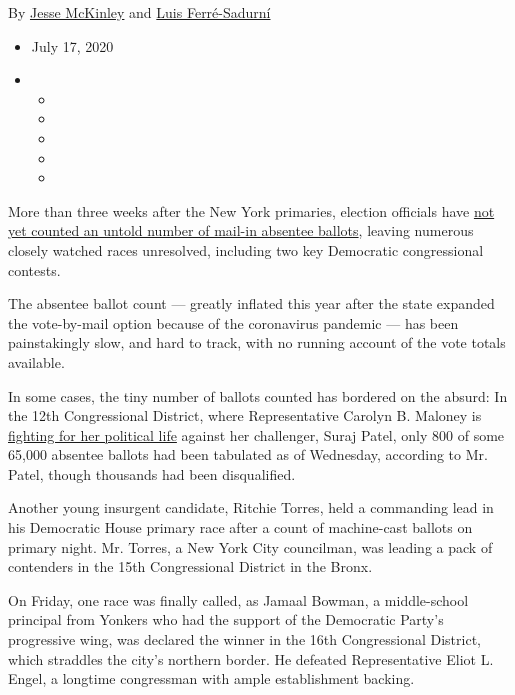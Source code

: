 By \href{https://www.nytimes.com/by/jesse-mckinley}{Jesse McKinley} and
\href{https://www.nytimes.com/by/luis-ferre-sadurni}{Luis Ferré-Sadurní}

\begin{itemize}
\item
  July 17, 2020
\item
  \begin{itemize}
  \item
  \item
  \item
  \item
  \item
  \end{itemize}
\end{itemize}

More than three weeks after the New York primaries, election officials
have
\href{https://www.nytimes.com/2020/08/03/nyregion/nyc-mail-ballots-voting.html}{not
yet counted an untold number of mail-in absentee ballots}, leaving
numerous closely watched races unresolved, including two key Democratic
congressional contests.

The absentee ballot count --- greatly inflated this year after the state
expanded the vote-by-mail option because of the coronavirus pandemic ---
has been painstakingly slow, and hard to track, with no running account
of the vote totals available.

In some cases, the tiny number of ballots counted has bordered on the
absurd: In the 12th Congressional District, where Representative Carolyn
B. Maloney is \href{https://web.enrboenyc.us/CD235630.html}{fighting for
her political life} against her challenger, Suraj Patel, only 800 of
some 65,000 absentee ballots had been tabulated as of Wednesday,
according to Mr. Patel, though thousands had been disqualified.

Another young insurgent candidate, Ritchie Torres, held a commanding
lead in his Democratic House primary race after a count of machine-cast
ballots on primary night. Mr. Torres, a New York City councilman, was
leading a pack of contenders in the 15th Congressional District in the
Bronx.

On Friday, one race was finally called, as Jamaal Bowman, a
middle-school principal from Yonkers who had the support of the
Democratic Party's progressive wing, was declared the winner in the 16th
Congressional District, which straddles the city's northern border. He
defeated Representative Eliot L. Engel, a longtime congressman with
ample establishment backing.


